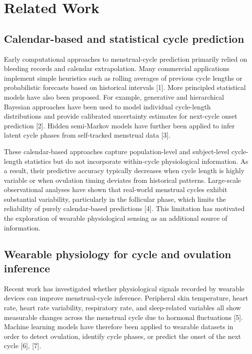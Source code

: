 \documentclass[conference]{IEEEtran}
\begin{document}
\section{Related Work}

\subsection{Calendar-based and statistical cycle prediction}

Early computational approaches to menstrual-cycle prediction primarily relied on bleeding records and calendar extrapolation. Many commercial applications implement simple heuristics such as rolling averages of previous cycle lengths or probabilistic forecasts based on historical intervals [1]. More principled statistical models have also been proposed. For example, generative and hierarchical Bayesian approaches have been used to model individual cycle-length distributions and provide calibrated uncertainty estimates for next-cycle onset prediction [2]. Hidden semi-Markov models have further been applied to infer latent cycle phases from self-tracked menstrual data [3].

These calendar-based approaches capture population-level and subject-level cycle-length statistics but do not incorporate within-cycle physiological information. As a result, their predictive accuracy typically decreases when cycle length is highly variable or when ovulation timing deviates from historical patterns. Large-scale observational analyses have shown that real-world menstrual cycles exhibit substantial variability, particularly in the follicular phase, which limits the reliability of purely calendar-based predictions [4]. This limitation has motivated the exploration of wearable physiological sensing as an additional source of information.

\subsection{Wearable physiology for cycle and ovulation inference}

Recent work has investigated whether physiological signals recorded by wearable devices can improve menstrual-cycle inference. Peripheral skin temperature, heart rate, heart rate variability, respiratory rate, and sleep-related variables all show measurable changes across the menstrual cycle due to hormonal fluctuations [5]. Machine learning models have therefore been applied to wearable datasets in order to detect ovulation, identify cycle phases, or predict the onset of the next cycle [6], [7].
\end{document}
